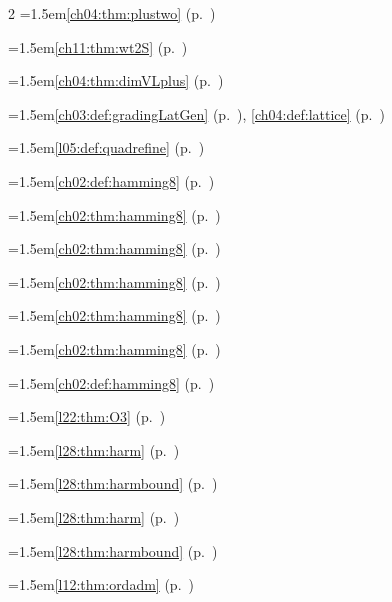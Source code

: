 \begin{multicols}{2}
\hangindent=1.5em\quad \ref{ch04:thm:plustwo} (p.~\pageref{ch04:thm:plustwo})\par
\hangindent=1.5em\quad \ref{ch11:thm:wt2S} (p.~\pageref{ch11:thm:wt2S})\par
\hangindent=1.5em\quad \ref{ch04:thm:dimVLplus} (p.~\pageref{ch04:thm:dimVLplus})\par
\hangindent=1.5em\quad \ref{ch03:def:gradingLatGen} (p.~\pageref{ch03:def:gradingLatGen}), \ref{ch04:def:lattice} (p.~\pageref{ch04:def:lattice})\par
\hangindent=1.5em\quad \ref{l05:def:quadrefine} (p.~\pageref{l05:def:quadrefine})\par
\hangindent=1.5em\quad \ref{ch02:def:hamming8} (p.~\pageref{ch02:def:hamming8})\par
\hangindent=1.5em\quad \ref{ch02:thm:hamming8} (p.~\pageref{ch02:thm:hamming8})\par
\hangindent=1.5em\quad \ref{ch02:thm:hamming8} (p.~\pageref{ch02:thm:hamming8})\par
\hangindent=1.5em\quad \ref{ch02:thm:hamming8} (p.~\pageref{ch02:thm:hamming8})\par
\hangindent=1.5em\quad \ref{ch02:thm:hamming8} (p.~\pageref{ch02:thm:hamming8})\par
\hangindent=1.5em\quad \ref{ch02:thm:hamming8} (p.~\pageref{ch02:thm:hamming8})\par
\hangindent=1.5em\quad \ref{ch02:def:hamming8} (p.~\pageref{ch02:def:hamming8})\par
\hangindent=1.5em\quad \ref{l22:thm:O3} (p.~\pageref{l22:thm:O3})\par
\hangindent=1.5em\quad \ref{l28:thm:harm} (p.~\pageref{l28:thm:harm})\par
\hangindent=1.5em\quad \ref{l28:thm:harmbound} (p.~\pageref{l28:thm:harmbound})\par
\hangindent=1.5em\quad \ref{l28:thm:harm} (p.~\pageref{l28:thm:harm})\par
\hangindent=1.5em\quad \ref{l28:thm:harmbound} (p.~\pageref{l28:thm:harmbound})\par
\hangindent=1.5em\quad \ref{l12:thm:ordadm} (p.~\pageref{l12:thm:ordadm})\par

\end{multicols}
